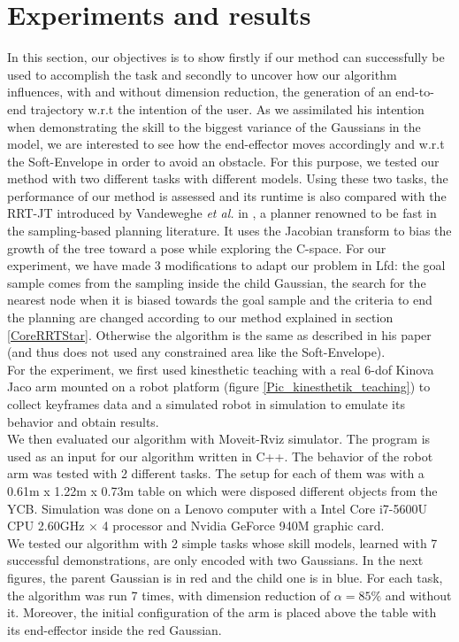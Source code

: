 \documentclass[letterpaper, 10 pt, conference]{ieeeconf}  %
\begin{document}
\section{Experiments and results}
  In this section, our objectives is to show firstly if our method can successfully be used to accomplish the task and secondly to uncover how our algorithm influences, with and without dimension reduction, the generation of an end-to-end trajectory w.r.t the intention of the user. As we assimilated his intention when demonstrating the skill to the biggest variance of the Gaussians in the model, we are interested to see how the end-effector moves accordingly and w.r.t the Soft-Envelope in order to avoid an obstacle. For this purpose, we tested our method with two different tasks with different models. 
  Using these two tasks, the performance of our method is assessed and its runtime is also compared with the RRT-JT introduced by Vandeweghe \textit{et al.} in \cite{Vandeweghe_2007_5981}, a planner renowned to be fast in the sampling-based planning literature. It uses the Jacobian transform to bias the growth of the tree toward a pose while exploring the C-space. For our experiment, we have made 3 modifications to adapt our problem in Lfd: the goal sample comes from the sampling inside the child Gaussian, the search for the nearest node when it is biased towards the goal sample and the criteria to end the planning are changed according to our method explained in section \ref{CoreRRTStar}. Otherwise the algorithm is the same as described in his paper (and thus does not used any constrained area like the Soft-Envelope). \\
  
For the experiment, we first used kinesthetic teaching with a real 6-dof Kinova Jaco arm mounted on a robot platform (figure \ref{Pic_kinesthetik_teaching}) to collect keyframes data and a simulated robot in simulation to emulate its behavior and obtain results.\\
We then evaluated our algorithm with Moveit-Rviz simulator. The program is used as an input for our algorithm written in C++. The behavior of the robot arm was tested with 2 different tasks. The setup for each of them was with a 0.61m x 1.22m x 0.73m table on which were disposed different objects from the YCB. Simulation was done on a Lenovo computer with  a Intel Core i7-5600U CPU 2.60GHz × 4 processor and Nvidia GeForce 940M graphic card.\\
We tested our algorithm with 2 simple tasks whose skill models, learned with 7 successful demonstrations, are only encoded with two Gaussians. In the next figures, the parent Gaussian is in red and the child one is in blue. For each task, the algorithm was run 7 times, with dimension reduction of $\alpha = 85 \%$ and without it. Moreover, the initial configuration of the arm is placed above the table with its end-effector inside the red Gaussian. \\
\end{document}
